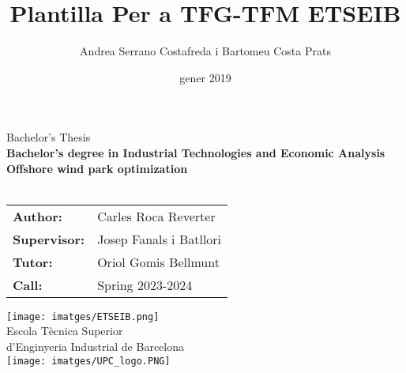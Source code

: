 \documentclass[a4paper,11pt, titlepage, twoside]{article}
\title{Plantilla Per a TFG-TFM ETSEIB}
\author{Andrea Serrano Costafreda i Bartomeu Costa Prats }
\date{gener 2019}
\begin{document}
\renewcommand{\refname}{Bibliografia}
\begin{titlepage}
    {\centering
    {\Huge Bachelor's Thesis}\\
    \vspace{5mm}
    {\Large \textbf{Bachelor's degree in Industrial Technologies and Economic Analysis}}\\
    \vspace{20mm}
    \Huge \textbf{Offshore wind park optimization}\\
    \vspace{10mm}
    \vspace{3mm}
    \Large{}\\  %
    }
    \vspace{20mm}
    \hspace{2mm}
    \begin{tabular}{l@{ } l}
        \vspace{5mm}
        \Large \textbf{Author:} & \Large{Carles Roca Reverter} \\
        \vspace{5mm}
        \Large\textbf{Supervisor:} & \Large{Josep Fanals i Batllori}\\
        \vspace{5mm}
        \Large\textbf{Tutor:} & \Large{Oriol Gomis Bellmunt}\\
        
         \Large\textbf{Call: } & \Large{Spring 2023-2024}\\
    \end{tabular}\par
    \vspace{10mm}
    {\centering
    \texttt{[image: imatges/ETSEIB.png]}\\
    {\Large Escola Tècnica Superior \\ d'Enginyeria Industrial de Barcelona}\\
    \vspace{3mm}
    \texttt{[image: imatges/UPC\_logo.PNG]}
    \par
    }
    \end{titlepage}

\clearpage
\thispagestyle{empty}
\null\newpage 
{}
\end{document}

